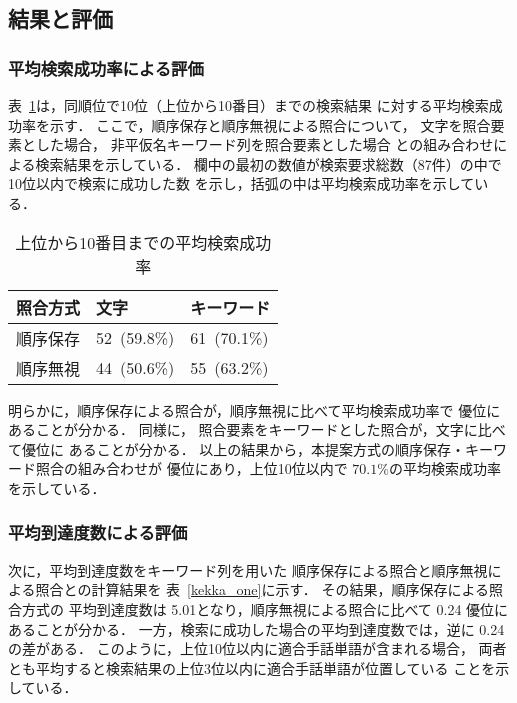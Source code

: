 \subsection {結果と評価}

\subsubsection {平均検索成功率による評価}

表~\ref{kekka_hyouka}は，同順位で10位（上位から10番目）までの検索結果
に対する平均検索成功率を示す．
ここで，順序保存と順序無視による照合について，
文字を照合要素とした場合，
非平仮名キーワード列を照合要素とした場合
との組み合わせによる検索結果を示している．
欄中の最初の数値が検索要求総数（87件）の中で10位以内で検索に成功した数
を示し，括弧の中は平均検索成功率を示している．

\begin{table}[htb]
\label{kekka_hyouka}
\caption{上位から10番目までの平均検索成功率}
\begin{center}
\footnotesize\tabcolsep=3pt
\begin{tabular}{c|p{}|p{}}\hline
 照合方式  & 文字 & キーワード \\ \hline\hline
 順序保存 & 52\ (59.8\%) & 61\ (70.1\%) \\ \hline
 順序無視 & 44\ (50.6\%) & 55\ (63.2\%) \\ \hline
\end{tabular}
\end{center}
\end{table}

明らかに，順序保存による照合が，順序無視に比べて平均検索成功率で
優位にあることが分かる．
同様に， 照合要素をキーワードとした照合が，文字に比べて優位に
あることが分かる．
以上の結果から，本提案方式の順序保存・キーワード照合の組み合わせが
優位にあり，上位10位以内で
$70.1\%$の平均検索成功率を示している．


\subsubsection {平均到達度数による評価}

次に，平均到達度数をキーワード列を用いた
順序保存による照合と順序無視による照合との計算結果を
表~\ref{kekka_one}に示す．
その結果，順序保存による照合方式の
平均到達度数は 5.01となり，順序無視による照合に比べて 0.24 優位に
あることが分かる．
一方，検索に成功した場合の平均到達度数では，逆に 0.24 の差がある．
このように，上位10位以内に適合手話単語が含まれる場合，
両者とも平均すると検索結果の上位3位以内に適合手話単語が位置している
ことを示している．

